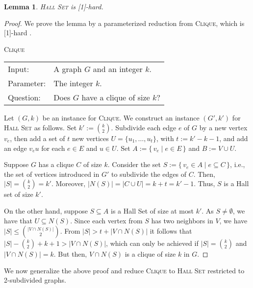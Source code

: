\documentclass[10pt,usletter]{article}
\newcommand{\SB}{\{\,}\newcommand{\SM}{\;{|}\;}\newcommand{\SE}{\,\}}
\newcommand{\W}[1][xxxx]{\text{\normalfont W}[#1]}
\newcommand{\HS}{\textsc{Hall Set}\xspace}
\newcommand{\CLIQUE}{\textsc{Clique}\xspace}
\newtheorem{lemma}[theorem]{Lemma}
\newcommand{\pbDefP}[4]{\noindent
\begin{center}
\begin{boxedminipage}{0.98 \columnwidth}
#1\\[5pt]
\begin{tabular}{l p{0.70 \columnwidth}}
Input: & #2\\
Parameter: & #3\\
Question: & #4
\end{tabular}
\end{boxedminipage}
\end{center}
}
\begin{document}
\begin{lemma}\label{lem:h1}
 \HS is {\rm \W[1]}-hard.
\end{lemma}
\begin{proof}
 We prove the lemma by a parameterized reduction from \CLIQUE, which is \W[1]-hard \citep{DowneyFellows99}.

 \pbDefP{\CLIQUE}
 {A graph $G$ and an integer $k$.}
 {The integer $k$.}
 {Does $G$ have a clique of size $k$?}

Let $(G,k)$ be an instance for \CLIQUE. We construct an instance $(G',k')$ for \HS as follows.
Set $k' := \binom{k}{2}$.
Subdivide each edge $e$ of $G$ by a new vertex $v_e$, then add a set of $t$ new vertices $U=\{u_1, \dots, u_t\}$,
with $t := k'-k-1$, and add an edge $v_eu$ for each $e\in E$ and $u\in
U$. Set $A:=\SB v_e \SM e\in E \SE$ and $B:=V\cup U$.

Suppose $G$ has a clique $C$ of size $k$. Consider the set $S := \SB
v_e\in A \SM e \subseteq C\SE$, i.e., the set of vertices introduced
in $G'$ to subdivide the edges of $C$. Then, $|S| = \binom{k}{2} = k'$. Moreover, $|N(S)| = |C \cup U| = k+t = k'-1$. Thus, $S$ is a
Hall set of size $k'$.

On the other hand, suppose $S \subseteq A$ is a Hall Set of size at most $k'$. As $S \neq \emptyset$, we have that $U \subseteq N(S)$.
Since each vertex from $S$ has two neighbors in $V$, we have $|S| \le \binom{|V\cap N(S)|}{2}$.
From $|S|>t+|V\cap N(S)|$ it follows that $|S|-\binom{k}{2}+k+1 > |V\cap N(S)|$, which can only be achieved if
$|S|=\binom{k}{2}$ and $|V\cap N(S)|=k$.
But then, $V\cap N(S)$ is a clique of size $k$ in $G$.
\end{proof}

We now generalize the above proof and reduce \CLIQUE to \HS restricted to
2-subdivided graphs.
\end{document}
